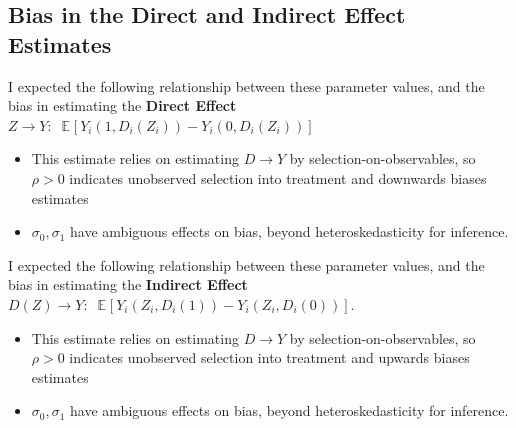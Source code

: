 \documentclass[a4paper, 12pt]{article}                                     %
\newcommand{\E}[2][]{\mathbb{E}_{#1} \left[ #2 \right]}                    %
\begin{document}
\subsection{Bias in the Direct and Indirect Effect Estimates}
I expected the following relationship between these parameter values, and the bias in estimating the \textbf{Direct Effect} $Z \to Y:\;\; \E{Y_i(1, D_i(Z_i)) - Y_i(0, D_i(Z_i))}$
\begin{itemize}
    \item This estimate relies on estimating $D \to Y$ by selection-on-observables, so $\rho > 0$ indicates unobserved selection into treatment and downwards biases estimates
    \item $\sigma_0, \sigma_1$ have ambiguous effects on bias, beyond heteroskedasticity for inference.
\end{itemize}

I expected the following relationship between these parameter values, and the bias in estimating the \textbf{Indirect Effect} $D(Z) \to Y:\;\; \E{Y_i(Z_i, D_i(1)) - Y_i(Z_i, D_i(0))}$.
\begin{itemize}
    \item This estimate relies on estimating $D \to Y$ by selection-on-observables, so $\rho > 0$ indicates unobserved selection into treatment and upwards biases estimates
    \item $\sigma_0, \sigma_1$ have ambiguous effects on bias, beyond heteroskedasticity for inference.
\end{itemize}
\end{document}
